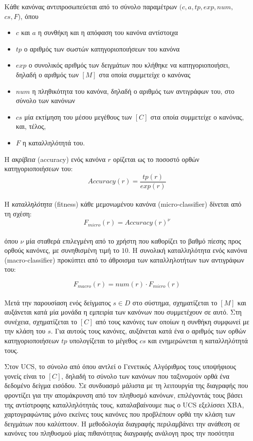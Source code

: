 Κάθε κανόνας αντιπροσωπεύεται από το σύνολο παραμέτρων $(c, a, tp, exp, num,$\newline $cs, F)$, όπου 

\begin{itemize}
\item $c$ και $a$ η συνθήκη και η απόφαση του κανόνα αντίστοιχα
\item $tp$ ο αριθμός των σωστών κατηγοριοποιήσεων του κανόνα
\item$exp$ ο συνολικός αριθμός των δειγμάτων που κλήθηκε να κατηγοριοποιήσει, δηλαδή ο αριθμός των $[M]$ στα οποία συμμετείχε ο κανόνας
\item $num$ η πληθικότητα του κανόνα, δηλαδή ο αριθμός των αντιγράφων του, στο σύνολο των κανόνων
\item $cs$ μία εκτίμηση του μέσου μεγέθους των $[C]$ στα οποία συμμετείχε ο κανόνας, και, τέλος, 
\item $F$ η καταλληλότητά του.
\end{itemize}

Η \emph{ακρίβεια} (accuracy) ενός κανόνα $r$ ορίζεται ως το ποσοστό ορθών κατηγοριοποιήσεων του:
\begin{equation}
Accuracy(r) = \frac{tp(r)}{exp(r)} 
\end{equation}
\\
Η \emph{καταλληλότητα} (fitness) κάθε μεμονωμένου κανόνα (micro-classifier) δίνεται από τη σχέση: 
\begin{equation}
F_{micro}(r) = Accuracy(r)^{\nu}
\end{equation}
\\
όπου $\nu$ μία σταθερά επιλεγμένη από το χρήστη που καθορίζει το βαθμό πίεσης προς ορθούς κανόνες, με συνηθισμένη τιμή το $10$. Η συνολική καταλληλότητα ενός κανόνα (macro-classifier) προκύπτει από το άθροισμα των καταλληλοτήτων των αντιγράφων του:

\begin{equation}
F_{macro}(r) = num(r) \cdot F_{micro}(r)
\end{equation}
\\
Μετά την παρουσίαση ενός δείγματος $s \in D$ στο σύστημα, σχηματίζεται το $[M]$ και αυξάνεται κατά μία μονάδα η εμπειρία των κανόνων που συμμετέχουν σε αυτό. Στη συνέχεια, σχηματίζεται το $[C]$ από τους κανόνες των οποίων η συνθήκη συμφωνεί με την κλάση του $s$. Για αυτούς τους κανόνες, αυξάνεται κατά ένα ο αριθμός των ορθών κατηγοριοποιήσεων $tp$ υπολογίζεται το μέγεθος $cs$ και ενημερώνεται η καταλληλότητά τους.

Στον UCS, το σύνολο από όπου αντλεί ο Γενετικός Αλγόριθμος τους υποψήφιους γονείς είναι το $[C]$, δηλαδή το σύνολο των κανόνων που ταξινομούν ορθά ένα δεδομένο δείγμα εισόδου. Σε συνδυασμό μάλιστα με τη λειτουργία της διαγραφής που φροντίζει για την απομάκρυνση από τον πληθυσμό κανόνων, επιλέγοντάς τους βάσει της αντίστροφης καταλληλότητάς τους, καταλαβαίνουμε πως ο UCS εξελίσσει ΧΒΑ, χαρτογραφώντας μόνο εκείνες τους κανόνες που προβλέπουν ορθά την κλάση των δειγμάτων που καλύπτουν. Η μεθοδολογία διαγραφής περιλαμβάνει την ανάθεση σε κανόνες του πληθυσμού μίας πιθανότητας διαγραφής ανάλογη προς την ποσότητα \\

